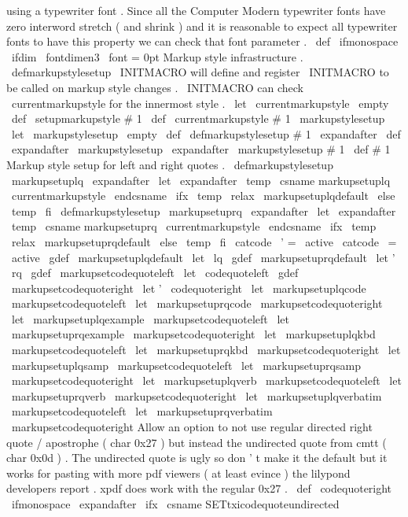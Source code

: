 {{{using
a
typewriter
font
.
Since
all
the
%
Computer
Modern
typewriter
fonts
have
zero
interword
stretch
(
and
%
shrink
)
and
it
is
reasonable
to
expect
all
typewriter
fonts
to
have
%
this
property
we
can
check
that
font
parameter
.
%
\
def
\
ifmonospace
{
\
ifdim
\
fontdimen3
\
font
=
0pt
}
%
Markup
style
infrastructure
.
\
defmarkupstylesetup
\
INITMACRO
will
%
define
and
register
\
INITMACRO
to
be
called
on
markup
style
changes
.
%
\
INITMACRO
can
check
\
currentmarkupstyle
for
the
innermost
%
style
.
\
let
\
currentmarkupstyle
\
empty
\
def
\
setupmarkupstyle
#
1
{
%
\
def
\
currentmarkupstyle
{
#
1
}
%
\
markupstylesetup
}
\
let
\
markupstylesetup
\
empty
\
def
\
defmarkupstylesetup
#
1
{
%
\
expandafter
\
def
\
expandafter
\
markupstylesetup
\
expandafter
{
\
markupstylesetup
#
1
}
%
\
def
#
1
%
}
%
Markup
style
setup
for
left
and
right
quotes
.
\
defmarkupstylesetup
\
markupsetuplq
{
%
\
expandafter
\
let
\
expandafter
\
temp
\
csname
markupsetuplq
\
currentmarkupstyle
\
endcsname
\
ifx
\
temp
\
relax
\
markupsetuplqdefault
\
else
\
temp
\
fi
}
\
defmarkupstylesetup
\
markupsetuprq
{
%
\
expandafter
\
let
\
expandafter
\
temp
\
csname
markupsetuprq
\
currentmarkupstyle
\
endcsname
\
ifx
\
temp
\
relax
\
markupsetuprqdefault
\
else
\
temp
\
fi
}
{
\
catcode
\
'
=
\
active
\
catcode
\
=
\
active
\
gdef
\
markupsetuplqdefault
{
\
let
\
lq
}
\
gdef
\
markupsetuprqdefault
{
\
let
'
\
rq
}
\
gdef
\
markupsetcodequoteleft
{
\
let
\
codequoteleft
}
\
gdef
\
markupsetcodequoteright
{
\
let
'
\
codequoteright
}
}
\
let
\
markupsetuplqcode
\
markupsetcodequoteleft
\
let
\
markupsetuprqcode
\
markupsetcodequoteright
%
\
let
\
markupsetuplqexample
\
markupsetcodequoteleft
\
let
\
markupsetuprqexample
\
markupsetcodequoteright
%
\
let
\
markupsetuplqkbd
\
markupsetcodequoteleft
\
let
\
markupsetuprqkbd
\
markupsetcodequoteright
%
\
let
\
markupsetuplqsamp
\
markupsetcodequoteleft
\
let
\
markupsetuprqsamp
\
markupsetcodequoteright
%
\
let
\
markupsetuplqverb
\
markupsetcodequoteleft
\
let
\
markupsetuprqverb
\
markupsetcodequoteright
%
\
let
\
markupsetuplqverbatim
\
markupsetcodequoteleft
\
let
\
markupsetuprqverbatim
\
markupsetcodequoteright
%
Allow
an
option
to
not
use
regular
directed
right
quote
/
apostrophe
%
(
char
0x27
)
but
instead
the
undirected
quote
from
cmtt
(
char
0x0d
)
.
%
The
undirected
quote
is
ugly
so
don
'
t
make
it
the
default
but
it
%
works
for
pasting
with
more
pdf
viewers
(
at
least
evince
)
the
%
lilypond
developers
report
.
xpdf
does
work
with
the
regular
0x27
.
%
\
def
\
codequoteright
{
%
\
ifmonospace
\
expandafter
\
ifx
\
csname
SETtxicodequoteundirected
}}}}

